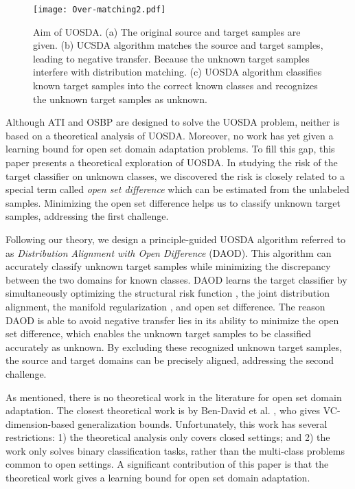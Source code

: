 \documentclass[journal]{IEEEtran}
\begin{document}
\begin{figure}[t]
\texttt{[image: Over-matching2.pdf]}
\caption{Aim of UOSDA. (a) The original source and target samples are given. (b) UCSDA algorithm matches the source and target samples, leading to negative transfer. Because the unknown target samples interfere with distribution matching. (c) UOSDA algorithm classifies  known  target  samples  into  the correct  known classes and recognizes the unknown target samples as unknown.
}\label{fig:UOSDA}
\end{figure}

Although ATI and OSBP are designed to solve the UOSDA problem, neither is based on a theoretical analysis of UOSDA. Moreover, no work has yet given a learning bound for open set domain adaptation problems. To fill this gap, this paper presents a theoretical exploration of UOSDA. In studying the risk of the target classifier on unknown classes, we discovered the risk is closely related to a special term called \textit{open set difference} which can be estimated from the unlabeled samples. Minimizing the open set difference helps us to classify unknown target samples, addressing the first challenge.

Following our theory, we design a principle-guided UOSDA algorithm referred to as \textit{Distribution Alignment with Open Difference} (DAOD). This algorithm can accurately classify unknown target samples while minimizing the discrepancy between the two domains for known classes. DAOD learns the target classifier by simultaneously optimizing the structural risk function \cite{DBLP:books/daglib/0097035}, the joint distribution alignment, the manifold regularization \cite{DBLP:journals/jmlr/BelkinNS06}, and open set difference.  The reason DAOD is able to avoid negative transfer lies in its ability to minimize the open set difference, which enables the unknown target samples to be classified accurately as unknown. By excluding these recognized unknown target samples, the source and target domains can be precisely aligned, addressing the second challenge.











As mentioned, there is no theoretical work in the literature for open set domain adaptation. The closest theoretical work is by Ben-David et al. \cite{DBLP:conf/nips/Ben-DavidBCP06}, who gives VC-dimension-based generalization bounds. Unfortunately, this work has several restrictions: 1) the theoretical analysis only covers closed settings; and 2) the work only solves binary classification tasks, rather than the multi-class problems common to open settings. A significant contribution of this paper is that the theoretical work gives a learning bound for open set domain adaptation. 
\end{document}
